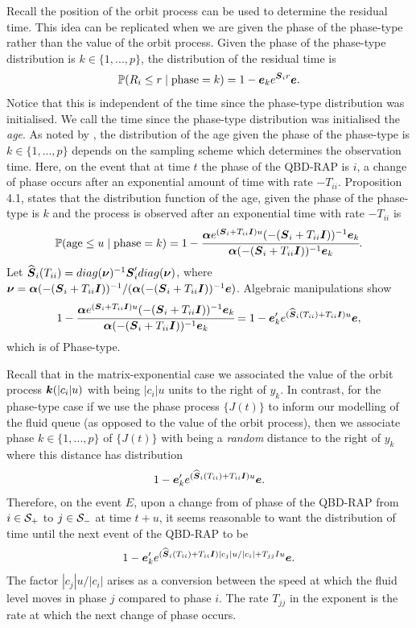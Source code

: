 Recall the position of the orbit process can be used to determine the residual time. This idea can be replicated when we are given the phase of the phase-type rather than the value of the orbit process. Given the phase of the phase-type distribution is \(k\in\{1,...,p\}\), the distribution of the residual time is 
\[\mathbb P(R_i\leq r \mid \mbox{phase}=k)=1-\boldsymbol e_k e^{\boldsymbol S_i r}\boldsymbol e.\]
Notice that this is independent of the time since the phase-type distribution was initialised. We call the time since the phase-type distribution was initialised the \emph{age}. As noted by \cite{hmp2017}, the distribution of the age given the phase of the phase-type is \(k\in\{1,...,p\}\) depends on the sampling scheme which determines the observation time. Here, on the event that at time \(t\) the phase of the QBD-RAP is \(i\), a change of phase occurs after an exponential amount of time with rate \(-T_{ii}\). Proposition 4.1, \cite{hmp2017} states that the distribution function of the age, given the phase of the phase-type is \(k\) and the process is observed after an exponential time with rate \(-T_{ii}\) is 
\[\mathbb P(\mbox{age}\leq u \mid \mbox{phase}=k )=1-\cfrac{\boldsymbol \alpha e^{(\boldsymbol S_i + T_{ii}\boldsymbol I)u}(-(\boldsymbol S_i+ T_{ii}\boldsymbol I))^{-1}\boldsymbol e_k}{\boldsymbol \alpha (-(\boldsymbol S_i+ T_{ii}\boldsymbol I))^{-1}\boldsymbol e_k}.\]
Let \(\widehat{ \boldsymbol S}_i(T_{ii}) = diag(\boldsymbol \nu)^{-1}\boldsymbol S_i'diag(\boldsymbol \nu)\), where \(\boldsymbol \nu = \boldsymbol\alpha(-(\boldsymbol S_i+ T_{ii}\boldsymbol I))^{-1}/(\boldsymbol\alpha(-(\boldsymbol S_i+ T_{ii}\boldsymbol I))^{-1}\boldsymbol e)\). Algebraic manipulations show
\begin{align}
	1-\cfrac{\boldsymbol \alpha e^{(\boldsymbol S_i + T_{ii}\boldsymbol I)u}(-(\boldsymbol S_i+ T_{ii}\boldsymbol I))^{-1}\boldsymbol e_k}{\boldsymbol \alpha (-(\boldsymbol S_i+ T_{ii}\boldsymbol I))^{-1}\boldsymbol e_k}
	= 1-\boldsymbol e_k' e^{(\widehat{\boldsymbol S}_i(T_{ii}) + T_{ii}\boldsymbol I)u} \boldsymbol e,\label{eqn: skgj}
\end{align}
which is of Phase-type. 

Recall that in the matrix-exponential case we associated the value of the orbit process \(\boldsymbol k(|c_i|u)\) with being \(|c_i|u\) units to the right of \(y_{k}\). In contrast, for the phase-type case if we use the phase process \(\{J(t)\}\) to inform our modelling of the fluid queue (as opposed to the value of the orbit process), then we associate phase \(k\in\{1,...,p\}\) of \(\{J(t)\}\) with being a \emph{random} distance to the right of \(y_k\) where this distance has distribution 
\begin{align}
	1-\boldsymbol e_k' e^{(\widehat{\boldsymbol S}_i(T_{ii}) + T_{ii}\boldsymbol I)u} \boldsymbol e.\label{eqn: skgj2}
\end{align}
Therefore, on the event \(E\), upon a change from of phase of the QBD-RAP from \(i\in\mathcal{S}_+\) to \(j\in\mathcal{S}_-\) at time \(t+u\), it seems reasonable to want the distribution of time until the next event of the QBD-RAP to be
\begin{align}
	1-\boldsymbol e_k' e^{(\widehat{\boldsymbol S}_i(T_{ii}) + T_{ii}\boldsymbol I)|c_j|u/|c_i| + T_{jj}Iu} \boldsymbol e.\label{eqn: skgj3}
\end{align}
The factor \(|c_j|u/|c_i|\) arises as a conversion between the speed at which the fluid level moves in phase \(j\) compared to phase \(i\). The rate \(T_{jj}\) in the exponent is the rate at which the next change of phase occurs. 

